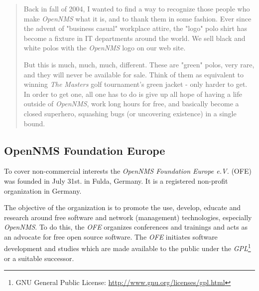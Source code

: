 \begin{quote}
Back in fall of 2004, I wanted to find a way to recognize those people who make \emph{OpenNMS} what it is, and to thank them in some fashion. 
Ever since the advent of "business casual" workplace attire, the "logo" polo shirt has become a fixture in IT departments around the world. We sell black and white polos with the \emph{OpenNMS} logo on our web site.

But this is much, much, much, different. These are "green" polos, very rare, and they will never be available for sale. Think of them as equivalent to winning \emph{The Masters} golf tournament's green jacket - only harder to get.
In order to get one, all one has to do is give up all hope of having a life outside of \emph{OpenNMS}, work long hours for free, and basically become a closed superhero, squashing bugs (or uncovering existence) in a single bound.
\end{quote}

\subsection*{OpenNMS Foundation Europe}
To cover non-commercial interests the \emph{OpenNMS Foundation Europe e.V.} (OFE) was founded in July 31st. in Fulda, Germany. It is a registered non-profit organization in Germany. 

The objective of the organization is to promote the use, develop, educate and research around free software and network (management) technologies, especially \emph{OpenNMS}. To do this, the \emph{OFE} organizes conferences and trainings and acts as an advocate for free open source software. The \emph{OFE} initiates software development and studies which are made available to the public under the \emph{GPL}\footnote{GNU General Public License: \url{http://www.gnu.org/licenses/gpl.html}} or a suitable successor.


